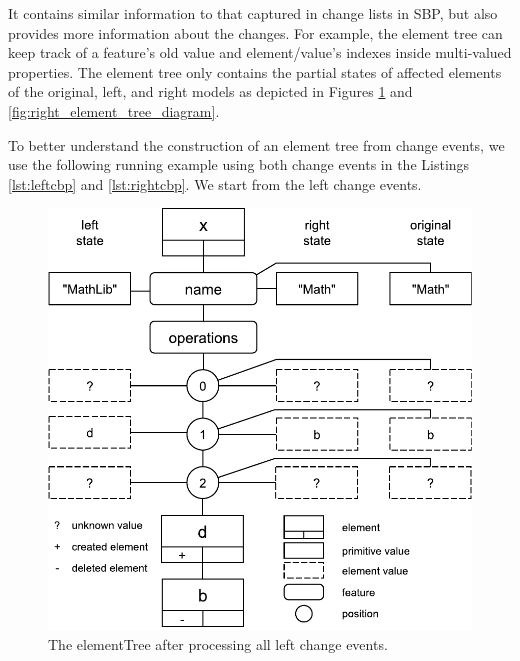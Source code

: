 It contains similar information to that captured in change lists in SBP, but also provides more information about the changes.
For example, the element tree can keep track of a feature's old value and element/value's indexes inside multi-valued properties. 
The element tree only contains the partial states of affected elements of the original, left, and right models as depicted in Figures \ref{fig:left_element_tree_diagram} and \ref{fig:right_element_tree_diagram}.

To better understand the construction of an element tree from change events, we use the following running example using both change events in the Listings \ref{lst:leftcbp} and \ref{lst:rightcbp}. We start from the left change events. 

\begin{figure}
    \includegraphics[width=\linewidth]{LeftElementTreeDiagram}
    \caption{The \textsf{elementTree} after processing all left change events.}
    \label{fig:left_element_tree_diagram}
\end{figure}

